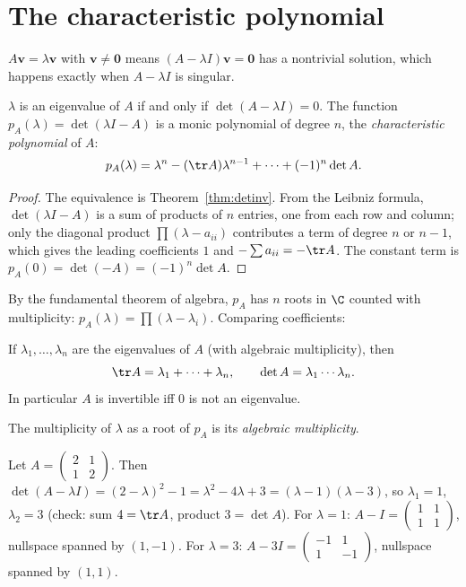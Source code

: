 \section{The characteristic polynomial}

$A\mathbf{v}=\lambda\mathbf{v}$ with $\mathbf{v}\ne\mathbf{0}$ means $(A-\lambda I)\mathbf{v}=\mathbf{0}$ has a nontrivial solution, which happens exactly when $A-\lambda I$ is singular.

\begin{theorem}\label{thm:chareq}
$\lambda$ is an eigenvalue of $A$ if and only if $\det(A-\lambda I)=0$. The function $p_A(\lambda)=\det(\lambda I-A)$ is a monic polynomial of degree $n$, the \emph{characteristic polynomial} of $A$:
\[ p_A(\lambda)=\lambda^n-(\tr A)\lambda^{n-1}+\dots+(-1)^n\det A. \]
\end{theorem}

\begin{proof}
The equivalence is Theorem~\ref{thm:detinv}. From the Leibniz formula, $\det(\lambda I-A)$ is a sum of products of $n$ entries, one from each row and column; only the diagonal product $\prod(\lambda-a_{ii})$ contributes a term of degree $n$ or $n-1$, which gives the leading coefficients $1$ and $-\sum a_{ii}=-\tr A$. The constant term is $p_A(0)=\det(-A)=(-1)^n\det A$.
\end{proof}

By the fundamental theorem of algebra, $p_A$ has $n$ roots in $\C$ counted with multiplicity: $p_A(\lambda)=\prod(\lambda-\lambda_i)$. Comparing coefficients:

\begin{corollary}\label{cor:trdet}
If $\lambda_1,\dots,\lambda_n$ are the eigenvalues of $A$ (with algebraic multiplicity), then
\[ \tr A=\lambda_1+\dots+\lambda_n,\qquad\det A=\lambda_1\cdots\lambda_n. \]
In particular $A$ is invertible iff $0$ is not an eigenvalue.
\end{corollary}

The multiplicity of $\lambda$ as a root of $p_A$ is its \emph{algebraic multiplicity}.

\begin{example}\label{ex:eigcompute}
Let $A=\begin{pmatrix}2&1\\1&2\end{pmatrix}$. Then $\det(A-\lambda I)=(2-\lambda)^2-1=\lambda^2-4\lambda+3=(\lambda-1)(\lambda-3)$, so $\lambda_1=1$, $\lambda_2=3$ (check: sum $4=\tr A$, product $3=\det A$). For $\lambda=1$: $A-I=\begin{pmatrix}1&1\\1&1\end{pmatrix}$, nullspace spanned by $(1,-1)$. For $\lambda=3$: $A-3I=\begin{pmatrix}-1&1\\1&-1\end{pmatrix}$, nullspace spanned by $(1,1)$.
\end{example}

